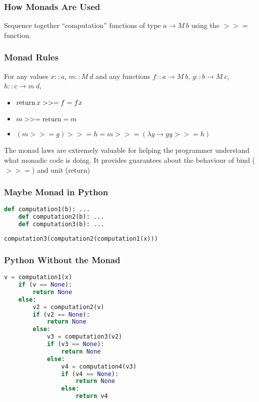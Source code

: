 \documentclass[presentation.tex]{subfiles}
\begin{document}
\begin{frame}
  \frametitle{How Monads Are Used}

  Sequence together ``computation'' functions of type $a \rightarrow
  M\ b$ using the $>>=$ function.
\end{frame}

\begin{frame}
  \frametitle{Monad Rules}
  For any values $x::a$, $m::M\ d$ and any functions $f::a \rightarrow M\ b$, $g::b \rightarrow M\ c$, $h::c \rightarrow m\ d$,
  \begin{itemize}
  \item
    $\operatorname{return} x >>= f = f x$
  \item
    $m >>= \operatorname{return} = m$
  \item
    $(m >>= g) >>= h = m >>= (\lambda y \rightarrow g y >>= h)$
  \end{itemize}

  The monad laws are extremely valuable for helping the programmer
  understand what monadic code is doing. It provides guarantees about
  the behaviour of bind ($>>=$) and unit (return)
\end{frame}

\begin{frame}[fragile]
  \frametitle{Maybe Monad in Python}
  \begin{lstlisting}[frame=single,language=Python,breaklines=true]
    def computation1(b): ...
    def computation2(b): ...	
    def computation3(b): ...
  \end{lstlisting}

\end{frame}

\begin{frame}[fragile]
  \begin{lstlisting}[frame=single,language=Python,breaklines=true]
    computation3(computation2(computation1(x)))
  \end{lstlisting}
\end{frame}

\begin{frame}[fragile]
  \frametitle{Python Without the Monad}
  \begin{lstlisting}[frame=single,language=Python,breaklines=true]
    v = computation1(x)
    if (v == None):
        return None
    else:
        v2 = computation2(v)
        if (v2 == None):
            return None
        else:
            v3 = computation3(v2)
            if (v3 == None):
                return None
            else:
                v4 = computation4(v3)
                if (v4 == None):
                    return None
                else:
                    return v4
  \end{lstlisting}
\end{frame}
\end{document}
